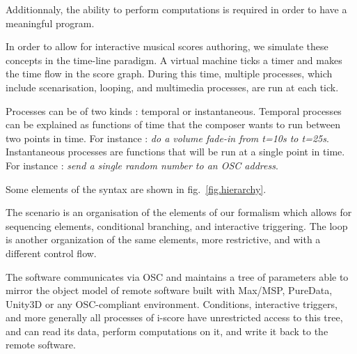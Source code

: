 \documentclass{article}
\begin{document}
Additionnaly, the ability to perform computations is required in order to have a meaningful program.

In order to allow for interactive musical scores authoring, we simulate these concepts in the time-line paradigm.
A virtual machine ticks a timer and makes the time flow in the score graph. 
During this time, multiple processes, which include scenarisation, looping, and multimedia processes, are 
run at each tick. 

Processes can be of two kinds : temporal or instantaneous.
Temporal processes can be explained as functions of time that the composer wants to run between 
two points in time. 
For instance : \emph{do a volume fade-in from t=10s to t=25s}.~\\
Instantaneous processes are functions that will be run at a single point in time.
For instance : \emph{send a single random number to an OSC address}.

Some elements of the syntax are shown in fig.~\ref{fig.hierarchy}.

The scenario is an organisation of the elements of our formalism which allows for sequencing elements, conditional branching, and interactive triggering.
The loop is another organization of the same elements, more restrictive, and with a different control flow.

The software communicates via OSC and maintains a tree of parameters able to mirror 
the object model of remote software built with Max/MSP, PureData, Unity3D or any OSC-compliant environment. 
Conditions, interactive triggers, and more generally all processes of i-score have unrestricted 
access to this tree, and can read its data, perform computations on it, and write it back to the 
remote software.
\end{document}
